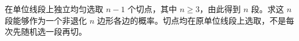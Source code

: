 在单位线段上独立均匀选取 $n-1$ 个切点，其中 $n\ge3$，由此得到 $n$ 段。求这 $n$ 段能够作为一个非退化 $n$ 边形各边的概率。切点均在原单位线段上选取，不是每次先随机选一段再切。
